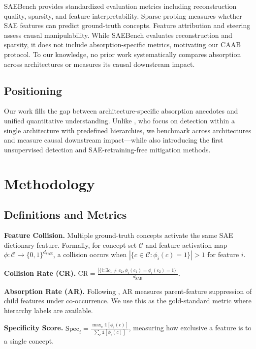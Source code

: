 \documentclass{article}
\begin{document}
SAEBench \citep{dunefsky2024saebench} provides standardized evaluation metrics including reconstruction quality, sparsity, and feature interpretability. Sparse probing \citep{marks2024sparse} measures whether SAE features can predict ground-truth concepts. Feature attribution and steering \citep{rimsky2024steering} assess causal manipulability. While SAEBench evaluates reconstruction and sparsity, it does not include absorption-specific metrics, motivating our CAAB protocol. To our knowledge, no prior work systematically compares absorption across architectures or measures its causal downstream impact.

\subsection{Positioning}

Our work fills the gap between architecture-specific absorption anecdotes and unified quantitative understanding. Unlike \citet{chanin2024causal}, who focus on detection within a single architecture with predefined hierarchies, we benchmark across architectures and measure causal downstream impact---while also introducing the first unsupervised detection and SAE-retraining-free mitigation methods.

\section{Methodology}

\subsection{Definitions and Metrics}

\textbf{Feature Collision.} Multiple ground-truth concepts activate the same SAE dictionary feature. Formally, for concept set $\mathcal{C}$ and feature activation map $\phi: \mathcal{C} \rightarrow \{0,1\}^{d_{\text{SAE}}}$, a collision occurs when $|\{c \in \mathcal{C} : \phi_i(c) = 1\}| > 1$ for feature $i$.

\textbf{Collision Rate (CR).} $\text{CR} = \frac{|\{i : \exists c_1 \neq c_2, \phi_i(c_1) = \phi_i(c_2) = 1\}|}{d_{\text{SAE}}}$.

\textbf{Absorption Rate (AR).} Following \citet{chanin2024causal}, AR measures parent-feature suppression of child features under co-occurrence. We use this as the gold-standard metric where hierarchy labels are available.

\textbf{Specificity Score.} $\text{Spec}_i = \frac{\max_c \mathbb{1}[\phi_i(c)]}{\sum_c \mathbb{1}[\phi_i(c)]}$, measuring how exclusive a feature is to a single concept.
\end{document}
